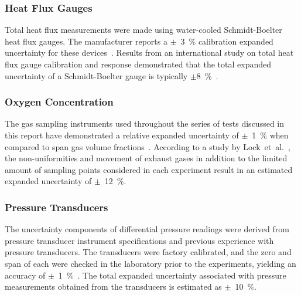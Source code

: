\documentclass[12pt,oneside]{book}
\begin{document}
\subsubsection*{Heat Flux Gauges}
Total heat flux measurements were made using water-cooled Schmidt-Boelter heat flux gauges. The manufacturer reports a $\pm$~3~\% calibration expanded uncertainty for these devices~\cite{Medtherm:2003}. Results from an international study on total heat flux gauge calibration and response demonstrated that the total expanded uncertainty of a Schmidt-Boelter gauge is typically $\pm$8~\%~\cite{Pitts:2006}.

\subsubsection*{Oxygen Concentration}
The gas sampling instruments used throughout the series of tests discussed in this report have demonstrated a relative expanded uncertainty of $\pm$~1~\% when compared to span gas volume fractions~\cite{Bundy:2007}. According to a study by Lock~et~al.~\cite{Lock:1}, the non-uniformities and movement of exhaust gases in addition to the limited amount of sampling points considered in each experiment result in an estimated expanded uncertainty of $\pm$~12~\%.


\subsubsection*{Pressure Transducers}
The uncertainty components of differential pressure readings were derived from pressure transducer instrument specifications and previous experience with pressure transducers. The transducers were factory calibrated, and the zero and span of each were checked in the laboratory prior to the experiments, yielding an accuracy of $\pm$~1~\%~\cite{Setra:2002}. The total expanded uncertainty associated with pressure measurements obtained from the transducers is estimated as $\pm$~10~\%.

\end{document}
